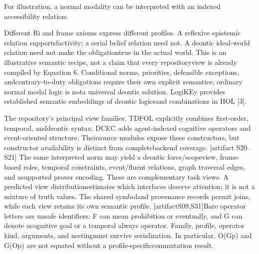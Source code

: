 \noindent
For illustration, a normal modality can be interpreted with an indexed accessibility relation:\par


\noindent
Different Ri and frame axioms express different profiles. A reflexive epistemic relation supports\linebreak[4]
factivity; a serial belief relation need not. A deontic ideal-world relation need not make the obligation\linebreak[4]
true in the actual world. This is an illustrative semantic recipe, not a claim that every repository\linebreak[4]
view is already compiled by Equation 6. Conditional norms, priorities, defeasible exceptions, and\linebreak[4]
contrary-to-duty obligations require their own explicit semantics; ordinary normal modal logic is not\linebreak[4]
a universal deontic solution. LogiKEy provides established semantic embeddings of deontic logics\linebreak[4]
and combinations in HOL [3].\par

\noindent
The repository's principal view families. TDFOL explicitly combines first-order, temporal, and\linebreak[4]
deontic syntax; DCEC adds agent-indexed cognitive operators and event-oriented structure. Their\linebreak[4]
source modules expose these constructors, but constructor availability is distinct from complete\linebreak[4]
backend coverage. [artifact S20--S21] The same interpreted norm may yield a deontic force/scope\linebreak[4]
view, frame-based roles, temporal constraints, event/fluent relations, graph traversal edges, and a\linebreak[4]
supported prover encoding. These are complementary task views. A predicted view distribution\linebreak[4]
estimates which interfaces deserve attention; it is not a mixture of truth values. The shared symbol\linebreak[4]
and provenance records permit joins, while each view retains its own semantic profile. [artifact\linebreak[4]
S09,S31]\linebreak[4]
Bare operator letters are unsafe identifiers: F can mean prohibition or eventually, and G can denote a\linebreak[4]
cognitive goal or a temporal always operator. Family, profile, operator kind, arguments, and nesting\linebreak[4]
must survive serialization. In particular, O(Gp) and G(Op) are not equated without a profile-specific\linebreak[4]
commutation result.\par

